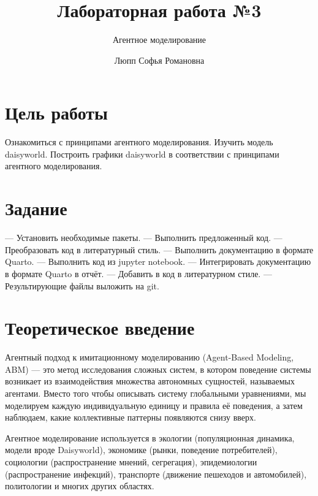 \documentclass[
  english,
  russian,
  12pt,
  a4paper,
  DIV=11,
  numbers=noendperiod]{scrreprt}
\title{Лабораторная работа №3}
\subtitle{Агентное моделирование}
\author{Люпп Софья Романовна}
\date{}
\renewcommand*\contentsname{Содержание}
\newcommand\contentsname{Содержание}
\begin{document}
\maketitle

\renewcommand*\contentsname{Содержание}
{
\setcounter{tocdepth}{1}
\tableofcontents
}
\listoffigures
\listoftables

\chapter{Цель
работы}\label{ux446ux435ux43bux44c-ux440ux430ux431ux43eux442ux44b}

Ознакомиться с принципами агентного моделирования. Изучить модель
daisyworld. Построить графики daisyworld в соответствии с принципами
агентного моделирования.

\chapter{Задание}\label{ux437ux430ux434ux430ux43dux438ux435}

--- Установить необходимые пакеты. --- Выполнить предложенный код. ---
Преобразовать код в литературный стиль. --- Выполнить документацию в
формате Quarto. --- Выполнить код из jupyter notebook. --- Интегрировать
документацию в формате Quarto в отчёт. --- Добавить в код в литературном
стиле. --- Результирующие файлы выложить на git.

\chapter{Теоретическое
введение}\label{ux442ux435ux43eux440ux435ux442ux438ux447ux435ux441ux43aux43eux435-ux432ux432ux435ux434ux435ux43dux438ux435}

Агентный подход к имитационному моделированию (Agent-Based Modeling,
ABM) --- это метод исследования сложных систем, в котором поведение
системы возникает из взаимодействия множества автономных сущностей,
называемых агентами. Вместо того чтобы описывать систему глобальными
уравнениями, мы моделируем каждую индивидуальную единицу и правила её
поведения, а затем наблюдаем, какие коллективные паттерны появляются
снизу вверх.

Агентное моделирование используется в экологии (популяционная динамика,
модели вроде Daisyworld), экономике (рынки, поведение потребителей),
социологии (распространение мнений, сегрегация), эпидемиологии
(распространение инфекций), транспорте (движение пешеходов и
автомобилей), политологии и многих других областях.
\end{document}
